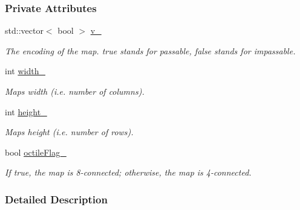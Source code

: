 \subsubsection*{Private Attributes}
\begin{DoxyCompactItemize}
\item 
std\+::vector$<$ bool $>$ \hyperlink{structGridMap_a4f547ccf505e5cfd4f6c061850458b71}{v\+\_\+}\hypertarget{structGridMap_a4f547ccf505e5cfd4f6c061850458b71}{}\label{structGridMap_a4f547ccf505e5cfd4f6c061850458b71}

\begin{DoxyCompactList}\small\item\em The encoding of the map. {\ttfamily true} stands for passable, {\ttfamily false} stands for impassable. \end{DoxyCompactList}\item 
int \hyperlink{structGridMap_ad9ae831adfb9a29b6ebf4d295fe72f54}{width\+\_\+}\hypertarget{structGridMap_ad9ae831adfb9a29b6ebf4d295fe72f54}{}\label{structGridMap_ad9ae831adfb9a29b6ebf4d295fe72f54}

\begin{DoxyCompactList}\small\item\em Map\textquotesingle{}s width (i.\+e. number of columns). \end{DoxyCompactList}\item 
int \hyperlink{structGridMap_aae0feda9914a4551d87220bc848ca513}{height\+\_\+}\hypertarget{structGridMap_aae0feda9914a4551d87220bc848ca513}{}\label{structGridMap_aae0feda9914a4551d87220bc848ca513}

\begin{DoxyCompactList}\small\item\em Map\textquotesingle{}s height (i.\+e. number of rows). \end{DoxyCompactList}\item 
bool \hyperlink{structGridMap_ac5ee3c493248585fa0e07244d36a1133}{octile\+Flag\+\_\+}\hypertarget{structGridMap_ac5ee3c493248585fa0e07244d36a1133}{}\label{structGridMap_ac5ee3c493248585fa0e07244d36a1133}

\begin{DoxyCompactList}\small\item\em If {\ttfamily true}, the map is 8-\/connected; otherwise, the map is 4-\/connected. \end{DoxyCompactList}\end{DoxyCompactItemize}


\subsubsection{Detailed Description}

